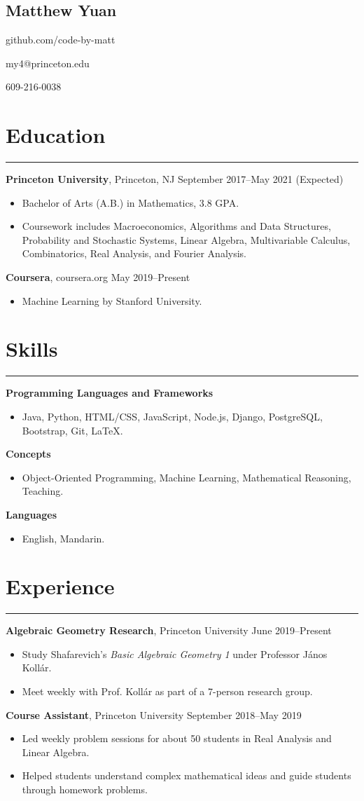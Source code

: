 \documentclass[11pt]{article}
\newcommand{\name}[1]{\begin{center}\section*{\huge #1}\end{center}}
\newcommand{\topinfo}[1]{\begin{center}\vspace{-0.2cm}#1\vspace{-0.2cm}\end{center}}
\newcommand{\resumesection}[1]{\vspace{-0.2cm}\section*{#1}\vspace{-0.2cm}\hrule\vspace{0.2cm}}
\begin{document}
\name{Matthew Yuan}
\topinfo{github.com/code-by-matt}
\topinfo{my4@princeton.edu}
\topinfo{609-216-0038}

\resumesection{Education}

\textbf{Princeton University}, Princeton, NJ \hfill September 2017--May 2021 (Expected)
\begin{itemize}
	\item Bachelor of Arts (A.B.) in Mathematics, 3.8 GPA.
	\item Coursework includes Macroeconomics, Algorithms and Data Structures, Probability and Stochastic Systems, Linear Algebra, Multivariable Calculus, Combinatorics, Real Analysis, and Fourier Analysis.
\end{itemize}

\textbf{Coursera}, coursera.org \hfill May 2019--Present
\begin{itemize}
	\item Machine Learning by Stanford University.
\end{itemize}

\resumesection{Skills}

\textbf{Programming Languages and Frameworks}
\begin{itemize}
	\item Java, Python, HTML/CSS, JavaScript, Node.js, Django, PostgreSQL, Bootstrap, Git, \LaTeX.
\end{itemize}

\textbf{Concepts}
\begin{itemize}
	\item Object-Oriented Programming, Machine Learning, Mathematical Reasoning, Teaching.
\end{itemize}

\textbf{Languages}
\begin{itemize}
	\item English, Mandarin.
\end{itemize}

\resumesection{Experience}

\textbf{Algebraic Geometry Research}, Princeton University \hfill June 2019--Present
\begin{itemize}
	\item Study Shafarevich's \textit{Basic Algebraic Geometry 1} under Professor J\'{a}nos Koll\'{a}r.
	\item Meet weekly with Prof. Koll\'{a}r as part of a 7-person research group.
\end{itemize}

\textbf{Course Assistant}, Princeton University \hfill September 2018--May 2019
\begin{itemize}
	\item Led weekly problem sessions for about 50 students in Real Analysis and Linear Algebra.
	\item Helped students understand complex mathematical ideas and guide students through homework problems.
\end{itemize}
\end{document}
